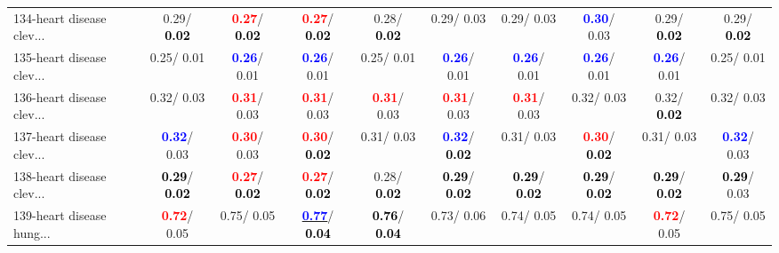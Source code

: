\begin{table}[h]
\begin{center}
{\begin{tabular}{lc|c|c|c|c|c|c|c|c}
134-heart disease clev... &   0.29/\textcolor{black}{\textbf{  0.02}} & \textcolor{red}{\textbf{  0.27}}/\textcolor{black}{\textbf{  0.02}} & \textcolor{red}{\textbf{  0.27}}/\textcolor{black}{\textbf{  0.02}} &   0.28/\textcolor{black}{\textbf{  0.02}} &   0.29/  0.03 &   0.29/  0.03 & \textcolor{blue}{\textbf{  0.30}}/  0.03 &   0.29/\textcolor{black}{\textbf{  0.02}} &   0.29/\textcolor{black}{\textbf{  0.02}} \\
135-heart disease clev... &   0.25/  0.01 & \textcolor{blue}{\textbf{  0.26}}/  0.01 & \textcolor{blue}{\textbf{  0.26}}/  0.01 &   0.25/  0.01 & \textcolor{blue}{\textbf{  0.26}}/  0.01 & \textcolor{blue}{\textbf{  0.26}}/  0.01 & \textcolor{blue}{\textbf{  0.26}}/  0.01 & \textcolor{blue}{\textbf{  0.26}}/  0.01 &   0.25/  0.01 \\ \hline
136-heart disease clev... &   0.32/  0.03 & \textcolor{red}{\textbf{  0.31}}/  0.03 & \textcolor{red}{\textbf{  0.31}}/  0.03 & \textcolor{red}{\textbf{  0.31}}/  0.03 & \textcolor{red}{\textbf{  0.31}}/  0.03 & \textcolor{red}{\textbf{  0.31}}/  0.03 &   0.32/  0.03 &   0.32/\textcolor{black}{\textbf{  0.02}} &   0.32/  0.03 \\
137-heart disease clev... & \textcolor{blue}{\textbf{  0.32}}/  0.03 & \textcolor{red}{\textbf{  0.30}}/  0.03 & \textcolor{red}{\textbf{  0.30}}/\textcolor{black}{\textbf{  0.02}} &   0.31/  0.03 & \textcolor{blue}{\textbf{  0.32}}/\textcolor{black}{\textbf{  0.02}} &   0.31/  0.03 & \textcolor{red}{\textbf{  0.30}}/\textcolor{black}{\textbf{  0.02}} &   0.31/  0.03 & \textcolor{blue}{\textbf{  0.32}}/  0.03 \\
138-heart disease clev... & \textcolor{black}{\textbf{  0.29}}/\textcolor{black}{\textbf{  0.02}} & \textcolor{red}{\textbf{  0.27}}/\textcolor{black}{\textbf{  0.02}} & \textcolor{red}{\textbf{  0.27}}/\textcolor{black}{\textbf{  0.02}} &   0.28/\textcolor{black}{\textbf{  0.02}} & \textcolor{black}{\textbf{  0.29}}/\textcolor{black}{\textbf{  0.02}} & \textcolor{black}{\textbf{  0.29}}/\textcolor{black}{\textbf{  0.02}} & \textcolor{black}{\textbf{  0.29}}/\textcolor{black}{\textbf{  0.02}} & \textcolor{black}{\textbf{  0.29}}/\textcolor{black}{\textbf{  0.02}} & \textcolor{black}{\textbf{  0.29}}/  0.03 \\
139-heart disease hung... & \textcolor{red}{\textbf{  0.72}}/  0.05 &   0.75/  0.05 & \underline{\textcolor{blue}{\textbf{  0.77}}}/\textcolor{black}{\textbf{  0.04}} & \textcolor{black}{\textbf{  0.76}}/\textcolor{black}{\textbf{  0.04}} &   0.73/  0.06 &   0.74/  0.05 &   0.74/  0.05 & \textcolor{red}{\textbf{  0.72}}/  0.05 &   0.75/  0.05 \\

\end{tabular}}
\end{center}
\end{table}

